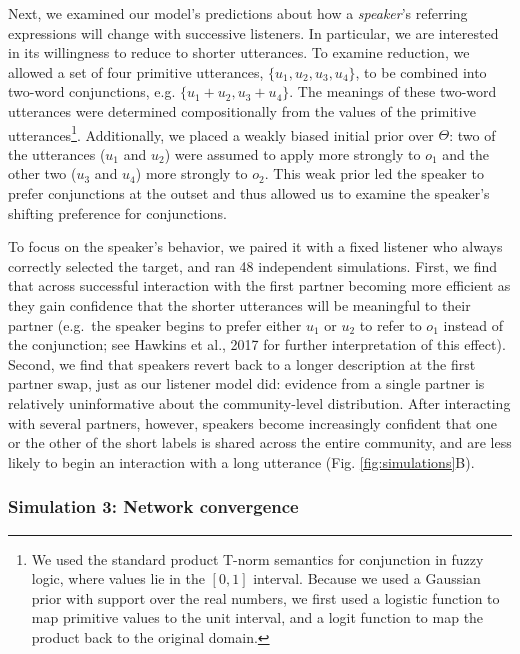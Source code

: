 \documentclass[10pt, letterpaper]{article}
\begin{document}
Next, we examined our model's predictions about how a \emph{speaker}'s
referring expressions will change with successive listeners. In
particular, we are interested in its willingness to reduce to shorter
utterances. To examine reduction, we allowed a set of four primitive
utterances, \(\{u_1, u_2, u_3, u_4\}\), to be combined into two-word
conjunctions, e.g. \(\{u_1+u_2, u_3+u_4\}\). The meanings of these
two-word utterances were determined compositionally from the values of
the primitive utterances\footnote{We used the standard product T-norm
  semantics for conjunction in fuzzy logic, where values lie in the
  \([0,1]\) interval. Because we used a Gaussian prior with support over
  the real numbers, we first used a logistic function to map primitive
  values to the unit interval, and a logit function to map the product
  back to the original domain.}. Additionally, we placed a weakly biased
initial prior over \(\Theta\): two of the utterances (\(u_1\) and
\(u_2\)) were assumed to apply more strongly to \(o_1\) and the other
two (\(u_3\) and \(u_4\)) more strongly to \(o_2\). This weak prior led
the speaker to prefer conjunctions at the outset and thus allowed us to
examine the speaker's shifting preference for conjunctions.

To focus on the speaker's behavior, we paired it with a fixed listener
who always correctly selected the target, and ran 48 independent
simulations. First, we find that across successful interaction with the
first partner becoming more efficient as they gain confidence that the
shorter utterances will be meaningful to their partner (e.g.~the speaker
begins to prefer either \(u_1\) or \(u_2\) to refer to \(o_1\) instead
of the conjunction; see Hawkins et al., 2017 for further interpretation
of this effect). Second, we find that speakers revert back to a longer
description at the first partner swap, just as our listener model did:
evidence from a single partner is relatively uninformative about the
community-level distribution. After interacting with several partners,
however, speakers become increasingly confident that one or the other of
the short labels is shared across the entire community, and are less
likely to begin an interaction with a long utterance (Fig.
\ref{fig:simulations}B).

\hypertarget{simulation-3-network-convergence}{%
\subsubsection{Simulation 3: Network
convergence}\label{simulation-3-network-convergence}}
\end{document}
